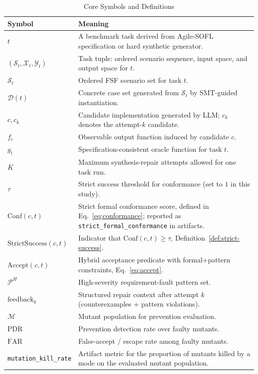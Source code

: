 \begin{table}[t]
\caption{Core Symbols and Definitions}
\label{tab:symbols}
\centering
\begin{tabular}{p{} p{}}
\toprule
Symbol & Meaning \\
\midrule
\(t\) & A benchmark task derived from Agile-SOFL specification or hard synthetic generator. \\
\((\mathcal{S}_t,\mathcal{X}_t,\mathcal{Y}_t)\) & Task tuple: ordered scenario sequence, input space, and output space for \(t\). \\
\(\mathcal{S}_t\) & Ordered FSF scenario set for task \(t\). \\
\(\mathcal{D}(t)\) & Concrete case set generated from \(\mathcal{S}_t\) by SMT-guided instantiation. \\
\(c, c_k\) & Candidate implementation generated by LLM; \(c_k\) denotes the attempt-\(k\) candidate. \\
\(f_c\) & Observable output function induced by candidate \(c\). \\
\(g_t\) & Specification-consistent oracle function for task \(t\). \\
\(K\) & Maximum synthesis-repair attempts allowed for one task run. \\
\(\tau\) & Strict success threshold for conformance (set to \(1\) in this study). \\
\(\mathrm{Conf}(c,t)\) & Strict formal conformance score, defined in Eq.~\ref{eq:conformance}; reported as \texttt{strict\_formal\_conformance} in artifacts. \\
\(\mathrm{StrictSuccess}(c,t)\) & Indicator that \(\mathrm{Conf}(c,t)\ge\tau\), Definition~\ref{def:strict-success}. \\
\(\mathrm{Accept}(c,t)\) & Hybrid acceptance predicate with formal+pattern constraints, Eq.~\ref{eq:accept}. \\
\(\mathcal{P}^{H}\) & High-severity requirement-fault pattern set. \\
\(\text{feedback}_k\) & Structured repair context after attempt \(k\) (counterexamples + pattern violations). \\
\(\mathcal{M}\) & Mutant population for prevention evaluation. \\
\(\mathrm{PDR}\) & Prevention detection rate over faulty mutants. \\
\(\mathrm{FAR}\) & False-accept / escape rate among faulty mutants. \\
\texttt{mutation\_kill\_rate} & Artifact metric for the proportion of mutants killed by a mode on the evaluated mutant population. \\
\bottomrule
\end{tabular}
\end{table}
